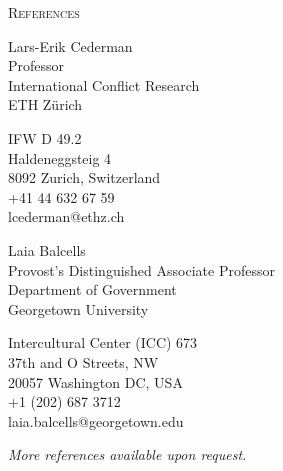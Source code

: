 \documentclass[a4paper, 11pt]{article}
\begin{document}

\noindent
\begin{minipage}[t]{0.14\textwidth}
  \flushleft
  \textsc{\small References}
\end{minipage}
\begin{minipage}[t]{0.86\textwidth}

	\begin{minipage}[t]{0.49\textwidth}
	Lars-Erik Cederman\\
	Professor\\
	International Conflict Research\\
	ETH Zürich

	\vspace{5pt}

	IFW D 49.2\\
	Haldeneggsteig 4\\
	8092 Zurich, Switzerland\\
	+41 44 632 67 59\\
	lcederman@ethz.ch
	\end{minipage}
	\begin{minipage}[t]{0.51\textwidth}
	Laia Balcells\\
	Provost's Distinguished Associate Professor\\
	Department of Government\\
	Georgetown University

	\vspace{5pt}

	Intercultural Center (ICC) 673\\
	37th and O Streets, NW\\
	20057 Washington DC, USA\\
	+1 (202) 687 3712\\
	laia.balcells@georgetown.edu
	\end{minipage}

	\vspace{20pt}

	\textit{More references available upon request.}

\end{minipage}

\vspace{20pt}


\end{document}
